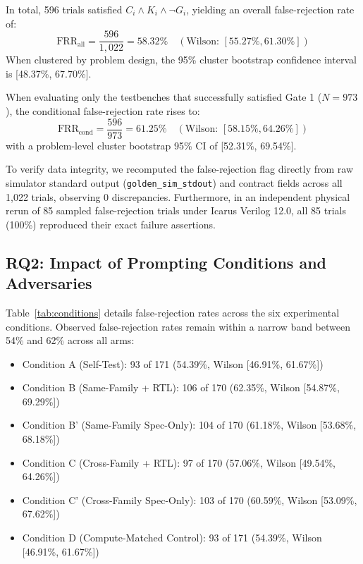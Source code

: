 \documentclass[conference]{IEEEtran}
\begin{document}
In total, 596 trials satisfied $C_i \land K_i \land \neg G_i$, yielding an overall false-rejection rate of:
\begin{equation}
\text{FRR}_{\text{all}} = \frac{596}{1,022} = 58.32\% \quad (\text{Wilson: } [55.27\%, 61.30\%])
\end{equation}
When clustered by problem design, the 95\% cluster bootstrap confidence interval is [48.37\%, 67.70\%].

When evaluating only the testbenches that successfully satisfied Gate 1 ($N=973$), the conditional false-rejection rate rises to:
\begin{equation}
\text{FRR}_{\text{cond}} = \frac{596}{973} = 61.25\% \quad (\text{Wilson: } [58.15\%, 64.26\%])
\end{equation}
with a problem-level cluster bootstrap 95\% CI of [52.31\%, 69.54\%].

To verify data integrity, we recomputed the false-rejection flag directly from raw simulator standard output (\texttt{golden\_sim\_stdout}) and contract fields across all 1,022 trials, observing 0 discrepancies. Furthermore, in an independent physical rerun of 85 sampled false-rejection trials under Icarus Verilog 12.0, all 85 trials (100\%) reproduced their exact failure assertions.

\subsection{RQ2: Impact of Prompting Conditions and Adversaries}
Table~\ref{tab:conditions} details false-rejection rates across the six experimental conditions. Observed false-rejection rates remain within a narrow band between 54\% and 62\% across all arms:
\begin{itemize}
    \item Condition A (Self-Test): 93 of 171 (54.39\%, Wilson [46.91\%, 61.67\%])
    \item Condition B (Same-Family + RTL): 106 of 170 (62.35\%, Wilson [54.87\%, 69.29\%])
    \item Condition B' (Same-Family Spec-Only): 104 of 170 (61.18\%, Wilson [53.68\%, 68.18\%])
    \item Condition C (Cross-Family + RTL): 97 of 170 (57.06\%, Wilson [49.54\%, 64.26\%])
    \item Condition C' (Cross-Family Spec-Only): 103 of 170 (60.59\%, Wilson [53.09\%, 67.62\%])
    \item Condition D (Compute-Matched Control): 93 of 171 (54.39\%, Wilson [46.91\%, 61.67\%])
\end{itemize}
\end{document}
